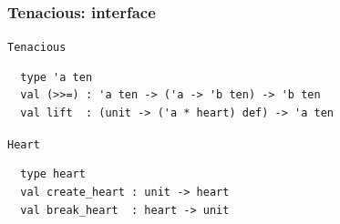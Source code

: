 \documentclass{beamer}
\begin{document}
% 
%




\begin{frame}[fragile]
\frametitle{Tenacious: interface}
{\tt Tenacious}
{\footnotesize
\begin{verbatim}
  type 'a ten
  val (>>=) : 'a ten -> ('a -> 'b ten) -> 'b ten
  val lift  : (unit -> ('a * heart) def) -> 'a ten
\end{verbatim}}

{\tt Heart}
{\footnotesize
\begin{verbatim}
  type heart
  val create_heart : unit -> heart
  val break_heart  : heart -> unit
\end{verbatim}}
\end{frame}

%

\end{document}
